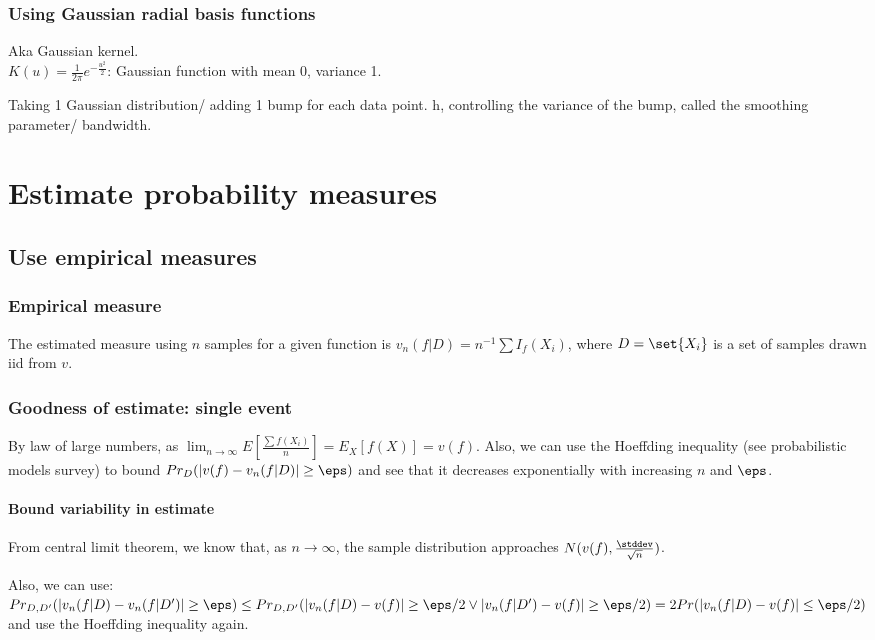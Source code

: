 \documentclass[oneside, article]{memoir}
\begin{document}
\subsubsection{Using Gaussian radial basis functions}
Aka Gaussian kernel.\\
 $K(u) = \frac{1}{2\pi}e^{-\frac{u^{2}}{2}}$: Gaussian function with mean 0, variance 1.

Taking 1 Gaussian distribution/ adding 1 bump for each data point. h, controlling the variance of the bump, called the smoothing parameter/ bandwidth.


\section{Estimate probability measures}
\subsection{Use empirical measures}
\subsubsection{Empirical measure}
The estimated measure using $n$ samples for a given function is $v_{n}(f| D) = n^{-1} \sum I_{f}(X_i)$, where $D = \set{X_i}$ is a set of samples drawn iid from $v$. 

\subsubsection{Goodness of estimate: single event}
By law of large numbers, as $\lim_{n \to \infty} E[\frac{\sum f(X_{i})}{n}] = E_X[f(X)] = v(f)$. Also, we can use the Hoeffding inequality (see probabilistic models survey) to bound $Pr_D(|v(f) - v_n(f|D)| \geq \eps)$ and see that it decreases exponentially with increasing $n$ and $\eps$.

\paragraph*{Bound variability in estimate}
From central limit theorem, we know that, as $n \to \infty$, the sample distribution approaches $N(v(f), \frac{\stddev}{\sqrt{n}})$.

Also, we can use: $Pr_{D, D'}(|v_n(f|D) - v_n(f|D')|\geq \eps) \leq Pr_{D, D'}(|v_n(f|D) - v(f)|\geq \eps/2 \lor |v_n(f|D') - v(f)|\geq \eps/2) = 2Pr(|v_n(f|D) - v(f)| \leq \eps/2)$ and use the Hoeffding inequality again.
\end{document}
